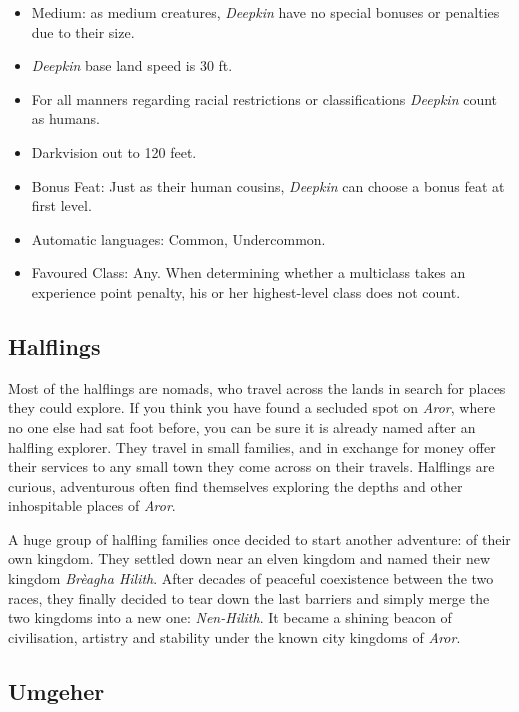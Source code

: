 \begin{35e}
  \begin{itemize}[noitemsep]
    \item Medium: as medium creatures, \emph{Deepkin} have no special bonuses or
    penalties due to their size.
    \item \emph{Deepkin} base land speed is 30 ft.
    \item For all manners regarding racial restrictions or classifications
    \emph{Deepkin} count as humans.
    \item Darkvision out to 120 feet.
    \item Bonus Feat: Just as their human cousins, \emph{Deepkin} can choose a
    bonus feat at first level.
    \item Automatic languages: Common, Undercommon.
    \item Favoured Class: Any. When determining whether a multiclass takes an
    experience point penalty, his or her highest-level class does not count.
  \end{itemize}
\end{35e}

\subsection*{Halflings}

Most of the halflings are nomads, who travel across the lands in search for
places they could explore. If you think you have found a secluded spot on
\emph{Aror}, where no one else had sat foot before, you can be sure it is
already named after an halfling explorer. They travel in small families, and
in exchange for money offer their services to any small town they come across
on their travels. Halflings are curious, adventurous often find themselves
exploring the depths and other inhospitable places of \emph{Aror}.

A huge group of halfling families once decided to start another adventure: of
their own kingdom. They settled down near an elven kingdom and named their new
kingdom \emph{Brèagha Hilith}. After decades of peaceful coexistence between
the two races, they finally decided to tear down the last barriers and simply
merge the two kingdoms into a new one: \emph{Nen-Hilith}. It became a shining
beacon of civilisation, artistry and stability under the known city kingdoms
of \emph{Aror}.


\subsection*{Umgeher}

